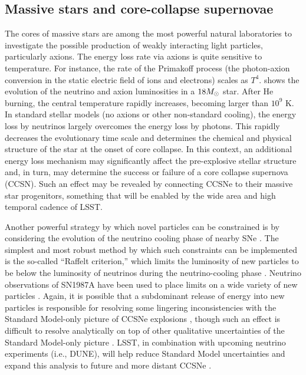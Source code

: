 \subsection{Massive stars and core-collapse supernovae}

The cores of massive stars are among the most powerful natural laboratories to investigate the possible production of weakly interacting light particles, particularly axions. 
The energy loss rate via axions is quite sensitive to temperature. 
For instance, the rate of the Primakoff process (the photon-axion conversion in the static electric field of ions and electrons) scales as $T^4$. 
 shows the evolution of the neutrino and axion luminosities in a $18M_\odot$ star. 
After He burning, the central temperature rapidly increases, becoming larger than $10^9$ K. 
In standard stellar models (no axions or other non-standard cooling), the energy loss by neutrinos largely overcomes the energy loss by photons. This rapidly decreases the evolutionary time scale and determines the chemical and physical structure of the star at the onset of core collapse. 
In this context, an additional energy loss mechanism may significantly affect the pre-explosive stellar structure and, in turn, may determine the success or failure of a core collapse supernova (CCSN). 
Such an effect may be revealed by connecting CCSNe to their massive star progenitors, something that will be enabled by the wide area and high temporal cadence of LSST.

Another powerful strategy by which novel particles can be constrained is by considering the evolution of the neutrino cooling phase of nearby SNe  \citep[\ie, SN1987A][]{Burrows:1988, Raffelt:1988}.
The simplest and most robust method by which such constraints can be implemented is the so-called ``Raffelt criterion,'' which limits the luminosity of new particles to be below the luminosity of neutrinos during the neutrino-cooling phase \citep{hep-ph/0611350}.
Neutrino observations of SN1987A have been used to place limits on a wide variety of new particles \citep{hep-ph/0207098, 1611.03864, 1611.05852, 1803.00993, 1808.10136}.
Again, it is possible that a subdominant release of energy into new particles is responsible for resolving some lingering inconsistencies with the Standard Model-only picture of CCSNe explosions \citep{0806.4273, 1805.07381}, though such an effect is difficult to resolve analytically on top of other qualitative uncertainties of the Standard Model-only picture \citep{1809.05106, 1811.11178}.
LSST, in combination with upcoming neutrino experiments (i.e., DUNE), will help reduce Standard Model uncertainties and expand this analysis to future and more distant CCSNe \citep{1807.10334}.

